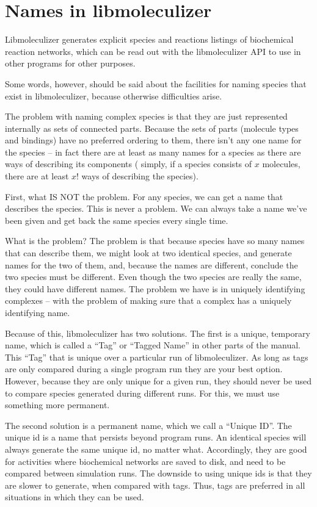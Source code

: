 \section{Names in libmoleculizer}

Libmoleculizer generates explicit species and reactions listings of
biochemical reaction networks, which can be read out with the
libmoleculizer API to use in other programs for other purposes.  

Some words, however, should be said about the facilities for naming
species that exist in libmoleculizer, because otherwise difficulties
arise.  

The problem with naming complex species is that they are just
represented internally as sets of connected parts.  Because the sets
of parts (molecule types and bindings) have no preferred ordering to
them, there isn't any one name for the species -- in fact there are at
least as many names for a species as there are ways of describing its
components ( simply, if a species consists of $x$ molecules, 
there are at least $x!$ ways of describing the species).  

First, what IS NOT the problem.  For any species, we can get a name
that describes the species.  This is never a problem.  We can always
take a name we've been given and get back the same species every
single time.

What is the problem?  The problem is that because species have so many
names that can describe them, we might look at two identical species,
and generate names for the two of them, and, because the names are
different, conclude the two species must be different.  Even though
the two species are really the same, they could have different names.
The problem we have is in uniquely identifying complexes -- with the
problem of making sure that a complex has a uniquely identifying
name.  

Because of this, libmoleculizer has two solutions.  The first is a
unique, temporary name, which is called a ``Tag'' or ``Tagged Name''
in other parts of the manual.  This ``Tag'' that is unique over a
particular run of libmoleculizer.  As long as tags are only compared
during a single program run they are your best option. However,
because they are only unique for a given run, they should never be
used to compare species generated during different runs.  For this, we
must use something more permanent.  

The second solution is a permanent name, which we call a ``Unique
ID''.  The unique id is a name that persists beyond program runs.  An
identical species will always generate the same unique id, no matter
what.  Accordingly, they are good for activities where biochemical
networks are saved to disk, and need to be compared between simulation
runs.  The downside to using unique ids is that they are slower to
generate, when compared with tags.  Thus, tags are preferred in all
situations in which they can be used.
